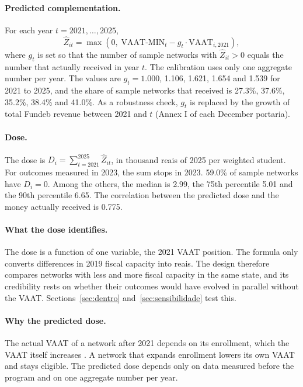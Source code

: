 \documentclass[11pt]{article}
\begin{document}
\paragraph{Predicted complementation.} For each year $t = 2021, \dots, 2025$,
\begin{equation}
\hat Z_{it} = \max\!\left(0,\; \text{VAAT-MIN}_t - g_t \cdot \text{VAAT}_{i,2021}\right),
\end{equation}
where $g_t$ is set so that the number of sample networks with $\hat Z_{it} > 0$ equals the number that actually received in year $t$. The calibration uses only one aggregate number per year. The values are $g_t = 1.000$, 1.106, 1.621, 1.654 and 1.539 for 2021 to 2025, and the share of sample networks that received is 27.3\%, 37.6\%, 35.2\%, 38.4\% and 41.0\%. As a robustness check, $g_t$ is replaced by the growth of total Fundeb revenue between 2021 and $t$ (Annex I of each December portaria).

\paragraph{Dose.} The dose is $D_i = \sum_{t=2021}^{2025} \hat Z_{it}$, in thousand reais of 2025 per weighted student. For outcomes measured in 2023, the sum stops in 2023. 59.0\% of sample networks have $D_i = 0$. Among the others, the median is 2.99, the 75th percentile 5.01 and the 90th percentile 6.65. The correlation between the predicted dose and the money actually received is 0.775.

\paragraph{What the dose identifies.} The dose is a function of one variable, the 2021 VAAT position. The formula only converts differences in 2019 fiscal capacity into reais. The design therefore compares networks with less and more fiscal capacity in the same state, and its credibility rests on whether their outcomes would have evolved in parallel without the VAAT. Sections~\ref{sec:dentro} and~\ref{sec:sensibilidade} test this.

\paragraph{Why the predicted dose.} The actual VAAT of a network after 2021 depends on its enrollment, which the VAAT itself increases \citep{franca2026}. A network that expands enrollment lowers its own VAAT and stays eligible. The predicted dose depends only on data measured before the program and on one aggregate number per year.
\end{document}
